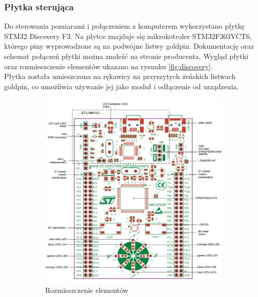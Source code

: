 \documentclass[12pt,a4paper]{article}
\begin{document}
\newpage
\subsubsection{Płytka sterująca}
Do sterowania pomiarami i połączeniem z komputerem wykorzystano płytkę STM32 Discovery F3. Na płytce znajduje się mikrokotroler STM32F303VCT6, którego piny wyprowadzone są na podwójne listwy goldpin. Dokumentację oraz schemat połączeń płytki można znaleźć na stronie producenta. Wygląd płytki oraz rozmieszczenie elementów ukazano na rysunku \ref{fig:discovery}.\\
Płytka została umieszczona na rękawicy na przyszytych żeńskich listwach goldpin, co umożliwia używanie jej jako moduł i odłączenie od urządzenia.
\begin{figure}[!htb]
\centering
\begin{subfigure}{.5\textwidth}
	\centering
	\includegraphics[height=.35\textheight]{images/stm32f3layout.png}
	\caption{Rozmieszczenie elementów}
\end{subfigure}%
\begin{subfigure}{.5\textwidth}
	\centering

\end{subfigure}
\end{figure}
\end{document}
